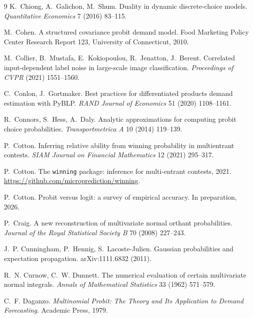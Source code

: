 \documentclass[12pt]{article}
\theoremstyle{remark}
\begin{document}
\begin{thebibliography}{9}
 K.~Chiong, A.~Galichon, M.~Shum. Duality in dynamic
discrete-choice models. \emph{Quantitative Economics} 7 (2016) 83--115.

 M.~Cohen. A structured covariance
probit demand model. Food Marketing Policy Center Research Report 123,
University of Connecticut, 2010.

 M.~Collier, B.~Mustafa, E.~Kokiopoulou,
R.~Jenatton, J.~Berent. Correlated input-dependent label noise in
large-scale image classification. \emph{Proceedings of CVPR} (2021)
1551--1560.

 C.~Conlon, J.~Gortmaker. Best practices for
differentiated products demand estimation with PyBLP. \emph{RAND Journal of
Economics} 51 (2020) 1108--1161.

 R.~Connors, S.~Hess, A.~Daly. Analytic approximations
for computing probit choice probabilities. \emph{Transportmetrica A} 10
(2014) 119--139.

 P.~Cotton. Inferring relative ability from winning
probability in multientrant contests. \emph{SIAM Journal on Financial Mathematics}
12 (2021) 295--317.

 P.~Cotton. The \texttt{winning} package: inference for multi-entrant contests,
2021. \url{https://github.com/microprediction/winning}.

 P.~Cotton. Probit versus logit:
a survey of empirical accuracy. In preparation, 2026.

 P.~Craig. A new reconstruction of
multivariate normal orthant probabilities. \emph{Journal of the Royal
Statistical Society B} 70 (2008) 227--243.

 J.~P. Cunningham, P.~Hennig, S.~Lacoste-Julien.
Gaussian probabilities and expectation propagation. arXiv:1111.6832 (2011).

 R.~N. Curnow, C.~W.
Dunnett. The numerical evaluation of certain multivariate normal
integrals. \emph{Annals of Mathematical Statistics} 33 (1962) 571--579.

 C.~F. Daganzo. \emph{Multinomial
Probit: The Theory and Its Application to Demand Forecasting}. Academic
Press, 1979.


\end{thebibliography}
\end{document}
